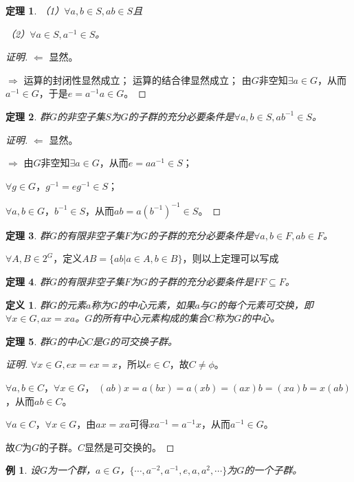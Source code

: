 \documentclass{article}
\newtheorem{Def}{定义}
\newtheorem{Thm}{定理}
\newtheorem*{Example}{例}
\begin{document}
\begin{CJK*}{UTF8}{gbsn}
\begin{Thm}
  （1）$\forall a,b\in S, ab\in S$且

  （2）$\forall a\in S, a^{-1}\in S$。
 \end{Thm}
\begin{proof}[证明]
  $\Leftarrow$ 显然。

  $\Rightarrow$
  运算的封闭性显然成立；
  运算的结合律显然成立；
  由$G$非空知$\exists a\in G$，从而$a^{-1}\in G$，于是$e=a^{-1}a\in G$。
\end{proof}
 \begin{Thm}
  群$G$的非空子集$S$为$G$的子群的充分必要条件是$\forall a,b\in S, ab^{-1}\in S$。
 \end{Thm}
 \begin{proof}[证明]
  $\Leftarrow$ 显然。

  $\Rightarrow$
  由$G$非空知$\exists a\in G$，从而$e=aa^{-1}\in S$；

  $\forall g\in G$，$g^{-1}=eg^{-1}\in S$；

  $\forall a,b\in G$，$b^{-1}\in S$，从而$ab=a(b^{-1})^{-1}\in S$。
\end{proof}

 \begin{Thm}
  群$G$的有限非空子集$F$为$G$的子群的充分必要条件是$\forall a,b\in F, ab\in F$。
 \end{Thm}

 $\forall A,B\in 2^G$，定义$AB=\{ab|a\in A,b\in B\}$，则以上定理可以写成

 \begin{Thm}
  群$G$的有限非空子集$F$为$G$的子群的充分必要条件是$FF\subseteq F$。
 \end{Thm}
 \begin{Def}
  群$G$的元素$a$称为$G$的中心元素，如果$a$与$G$的每个元素可交换，即$\forall x\in G, ax=xa$。$G$的所有中心元素构成的集合$C$称为$G$的中心。
 \end{Def}
 \begin{Thm}
  群$G$的中心$C$是$G$的可交换子群。
 \end{Thm}
\begin{proof}[证明]
$\forall x\in G, ex=ex=x$，所以$e\in C$，故$C\neq \phi$。

$\forall a,b\in C$，$\forall x\in G$，
$(ab)x=a(bx)=a(xb)=(ax)b=(xa)b=x(ab)$，从而$ab\in C$。

$\forall a\in C$，$\forall x\in G$，由$ax=xa$可得$xa^{-1}=a^{-1}x$，从而$a^{-1}\in G$。

故$C$为$G$的子群。$C$显然是可交换的。
\end{proof}
\begin{Example}
  设$G$为一个群，$a\in G$，$\{\cdots,a^{-2},a^{-1},e,a,a^2,\cdots\}$为$G$的一个子群。
\end{Example}


\end{CJK*}
\end{document}
